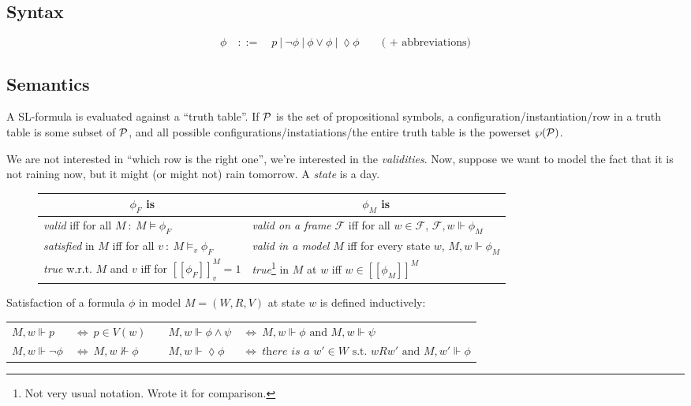 \subsection{Syntax}
$$\phi\quad ::= \quad p ~|~ \neg \phi ~|~ \phi \vee \phi ~|~ \lozenge \phi \quad\quad\text{( + abbreviations)}$$
\subsection{Semantics}
A SL-formula is evaluated against a ``truth table''. If $\mathcal P$ is the set of propositional symbols, a configuration/instantiation/row in a truth table is some subset of $\mathcal P$, and all possible configurations/instatiations/the entire truth table is the powerset $\wp(\mathcal P)$.

We are not interested in ``which row is the right one'', we're interested in the \textit{validities}. Now, suppose we want to model the fact that it is not raining now, but it might (or might not) rain tomorrow. A \textit{state} is a day. 

\begin{figure}[ht]
\centering
\begin{tabular}{l|l}
\multicolumn{1}{c}{$\phi_F$ is} & \multicolumn{1}{|c}{$\phi_M$ is} \\ \hline
\textit{valid} iff for all $M~:~M \vDash \phi_F$ & \textit{valid on a frame} $\mathcal F$ iff for all  $w \in \mathcal F$, $\mathcal F,w \Vdash \phi_M$\\
\textit{satisfied} in $M$ iff for all $v~:~M \vDash_v \phi_F$ & \textit{valid in a model } $M$ iff for every state $w$, $M, w \Vdash \phi_M$\\
\textit{true} w.r.t. $M$ and $v$ iff for $[\![\phi_F]\!]^M_v = 1$ & \textit{true}\footnote{Not very usual notation. Wrote it for comparison.} in $M$ at $w$ iff $w \in [\![\phi_M]\!]^M$\\
\end{tabular}
\end{figure}

Satisfaction of a formula $\phi$ in model $M = (W, R, V)$ at state $w$ is defined inductively: 
\begin{center}
\begin{tabular} {llcll}
$M, w \Vdash p $&$\iff~ p \in V(w)$ & \phantom{space} & $M, w \Vdash \phi \wedge \psi $&$\iff~ M, w \Vdash \phi \text{ and } M, w \Vdash \psi$ \\
$M, w \Vdash \neg \phi $&$\iff~ M, w \nVdash \phi$ & & $M, w \Vdash \lozenge \phi $&$\iff~ \textit{there is a }w'\in W \text{ s.t. } wRw' \text{ and } M, w' \Vdash \phi$\\
\end{tabular}
\end{center}

